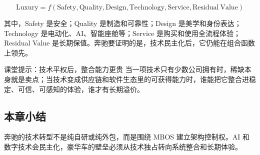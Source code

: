 \[
\mathrm{Luxury}=f(\mathrm{Safety},\mathrm{Quality},\mathrm{Design},\mathrm{Technology},\mathrm{Service},\mathrm{Residual\ Value})
\]

其中，Safety 是安全；Quality 是制造和可靠性；Design 是美学和身份表达；Technology 是电动化、AI、智能座舱等；Service 是购买和使用全流程体验；Residual Value 是长期保值。奔驰要证明的是，技术民主化后，它仍能在组合函数上领先。

\begin{knowledgebox}{课堂提示：技术平权后，整合能力更贵}
当一项技术只有少数公司拥有时，稀缺本身就是卖点；当技术变成供应链和软件生态里的可获得能力时，谁能把它整合进稳定、可信、可感知的体验，谁才有长期溢价。
\end{knowledgebox}

\subsection{本章小结}

奔驰的技术转型不是纯自研或纯外包，而是围绕 MBOS 建立架构控制权。AI 和数字技术会民主化，豪华车的壁垒必须从技术独占转向系统整合和长期体验。

